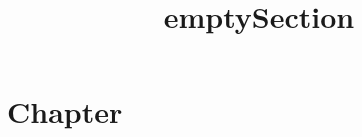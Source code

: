 \documentclass[a4paper,11pt,oneside,openany,report]{jsbook}
\title{emptySection}
\begin{document}
\maketitle
\chapter{Chapter}\label{ch:Chapter}
\section{}\label{sec:Chapter/961}
\end{document}
